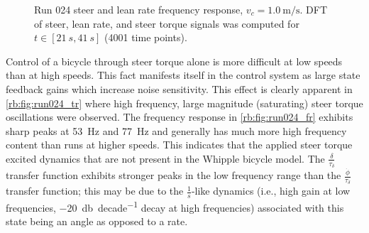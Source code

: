 \begin{figure}[htbp]
  \runtwentyfourfreq
  \centering
  \caption[Steer and lean rate frequency response at
    \SI{1.0}{\m\per\s}.]{Run 024 steer and lean rate frequency response,
    $v_c=\SI{1.0}{\m\per\s}$.  DFT of steer, lean rate, and steer torque
    signals was computed for $t \in [\SI{21}{s}, \SI{41}{s}]$ (4001 time
    points).}
  \label{rb:fig:run024_fr}
\end{figure}

Control of a bicycle through steer torque alone is more difficult at low speeds
than at high speeds. This fact manifests itself in the control system as large
state feedback gains which increase noise sensitivity. This effect is clearly
apparent in \autoref{rb:fig:run024_tr} where high frequency, large magnitude
(saturating) steer torque oscillations were observed. The frequency response in
\autoref{rb:fig:run024_fr} exhibits sharp peaks at \SI{53}{\Hz} and
\SI{77}{\Hz} and generally has much more high frequency content than runs at
higher speeds. This indicates that the applied steer torque excited dynamics
that are not present in the Whipple bicycle model. The
$\frac{\delta}{\tau_\delta}$ transfer function exhibits stronger peaks in the
low frequency range than the $\frac{\dot{\phi}}{\tau_\delta}$ transfer
function; this may be due to the $\frac{1}{s}$-like dynamics (i.e., high gain at low
frequencies, \SI{-20}{\decibel\per decade} decay at high frequencies)
associated with this state being an angle as opposed to a rate.

